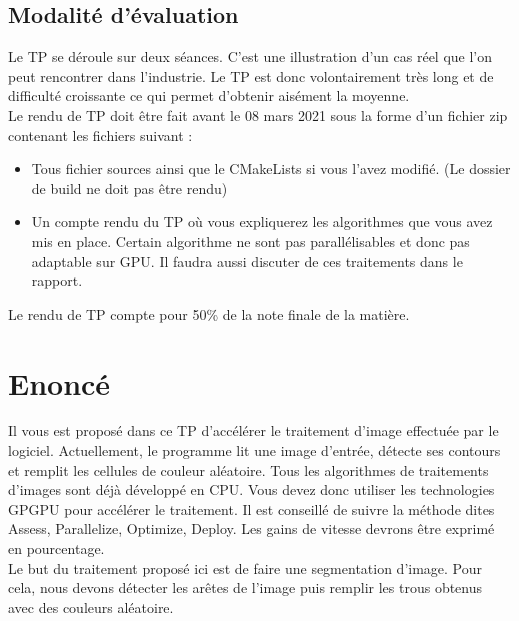 \documentclass{article}
\begin{document}
\subsection{Modalité d'évaluation}
Le TP se déroule sur deux séances. C'est une illustration d'un cas réel que l'on peut rencontrer dans l'industrie. Le TP est donc volontairement très long et de difficulté croissante ce qui permet d'obtenir aisément la moyenne.\\
Le rendu de TP doit être fait avant le 08 mars 2021 sous la forme d'un fichier zip contenant les fichiers suivant :
\begin{itemize}
	\item Tous fichier sources ainsi que le CMakeLists si vous l'avez modifié. (Le dossier de build ne doit pas être rendu)
	\item Un compte rendu du TP où vous expliquerez les algorithmes que vous avez mis en place. Certain algorithme ne sont pas parallélisables et donc pas adaptable sur GPU. Il faudra aussi discuter de ces traitements dans le rapport.
\end{itemize}
Le rendu de TP compte pour 50\% de la note finale de la matière.

\section{Enoncé}
Il vous est proposé dans ce TP d'accélérer le traitement d'image effectuée par le logiciel. Actuellement, le programme lit une image d'entrée, détecte ses contours et remplit les cellules de couleur aléatoire. Tous les algorithmes de traitements d'images sont déjà développé en CPU. Vous devez donc utiliser les technologies GPGPU pour accélérer le traitement. Il est conseillé de suivre la méthode dites Assess, Parallelize, Optimize, Deploy. Les gains de vitesse devrons être exprimé en pourcentage.\\
Le but du traitement proposé ici est de faire une segmentation d'image. Pour cela, nous devons détecter les arêtes de l'image puis remplir les trous obtenus avec des couleurs aléatoire.
\end{document}
